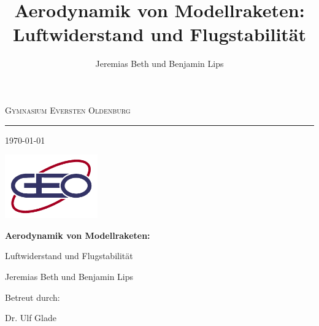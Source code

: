 \documentclass[10pt,a4paper]{article}
\author{Jeremias Beth und Benjamin Lips}
\title{Aerodynamik von Modellraketen: Luftwiderstand und  Flugstabilität}
\begin{document}
\begin{titlepage}
	\centering
	{\scshape\huge Gymnasium Eversten Oldenburg} 
	\noindent\rule{\textwidth}{0.5pt} %
	{\large \today} %
	\vspace{0.5cm}
	
	\includegraphics[width=4cm]{Bilder/GEO-logo.png} %
	
	\vspace{2cm}
	{\LARGE \bfseries Aerodynamik von Modellraketen: %
	
	\smallskip Luftwiderstand und Flugstabilität}
	
	\vspace{1cm}
	{\large Jeremias Beth und Benjamin Lips} %
	
	\vspace{3cm}
	{\large Betreut durch: %
		
	\smallskip Dr. Ulf Glade}
\end{titlepage}


\setcounter{page}{2}
\end{document}
